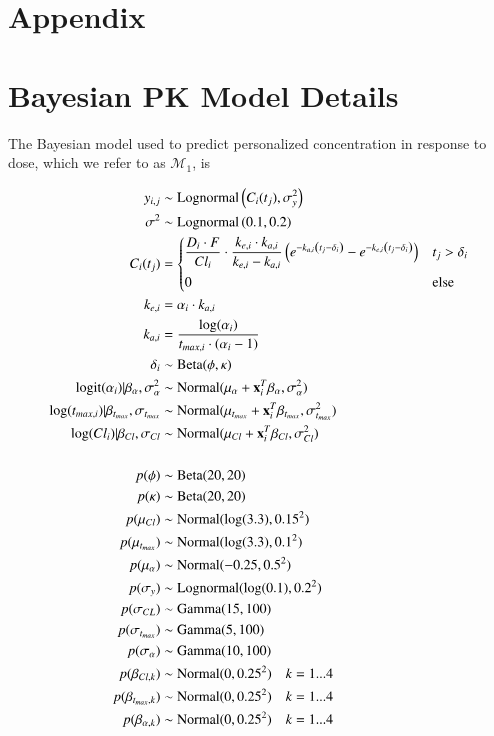 \section{Appendix}\label{ap:appendix}

\section{Bayesian PK Model Details}

The Bayesian model used to predict personalized concentration in response to dose, which we refer to as $ \mathcal{M}_1 $, is 

\begin{align}\label{model_M1}
	y_{i,j} &\sim \operatorname{Lognormal}  \left(  C_i(t_j)  , \sigma^2_y \right)  \\
	\sigma^2 &\sim \operatorname{Lognormal} \left( 0.1, 0.2 \right)\\	
	C_i(t_j) &= \begin{dcases}
	\frac{D_{i} \cdot F}{C l_{i}} \cdot \frac{k_{e, i} \cdot k_{a, i}}{k_{e, i}-k_{a, i}}\left(e^{-k_{a, i}\left(t_{j}-\delta_{i}\right)}-e^{-k_{e, i}\left(t_{j}-\delta_{i}\right)}\right) & t_j>\delta_i \\
	0 & \mbox{else}
	\end{dcases}\\
	k_{e,i} &= \alpha_i \cdot k_{a,i}\\
	k_{a,i} &= \dfrac{\log(\alpha_i)}{t_{max, i}\cdot(\alpha_i-1)}\\
	\delta_i &\sim \operatorname{Beta}(\phi, \kappa) \\
	\operatorname{logit}(\alpha_i) \vert \beta_\alpha, \sigma^2_\alpha &\sim \operatorname{Normal}(\mu_\alpha + \mathbf{x}_i^T \beta_\alpha, \sigma^2_\alpha)\\
	\log(t_{max, i}) \vert \beta_{t_{max}}, \sigma_{t_{max}} &\sim \operatorname{Normal}(\mu_{t_{max}} + \mathbf{x}^T_i \beta_{t_{max}}, \sigma^2_{t_{max}}) \\
	\log(Cl_i) \vert \beta_{Cl}, \sigma_{Cl} &\sim \operatorname{Normal}(\mu_{Cl} + \mathbf{x}^T_i \beta_{Cl}, \sigma^2_{Cl}) \\ \nonumber \\
	p(\phi) &\sim \operatorname{Beta}(20, 20)\\
	p(\kappa) &\sim \operatorname{Beta}(20, 20)\\
	p(\mu_{Cl}) &\sim \operatorname{Normal}(\log(3.3), 0.15^2)\\
	p(\mu_{t_{max}}) &\sim \operatorname{Normal}(\log(3.3), 0.1^2)\\
	p(\mu_{\alpha}) &\sim \operatorname{Normal}(-0.25, 0.5^2)\\
	p(\sigma_y) &\sim \operatorname{Lognormal}(\log(0.1), 0.2^2)\\
	p(\sigma_{CL}) &\sim \operatorname{Gamma}(15, 100)\\
	p(\sigma_{t_{max}}) &\sim \operatorname{Gamma}(5, 100)\\
	p(\sigma_{\alpha}) &\sim \operatorname{Gamma}(10, 100)\\
	p(\beta_{Cl, k}) &\sim \operatorname{Normal}(0, 0.25^2) \quad k = 1 ...	 4\\
	p(\beta_{t_{max}, k}) &\sim \operatorname{Normal}(0, 0.25^2) \quad k = 1 ... 4\\	
	p(\beta_{\alpha, k}) &\sim \operatorname{Normal}(0, 0.25^2) \quad k = 1 ... 4
\end{align}

